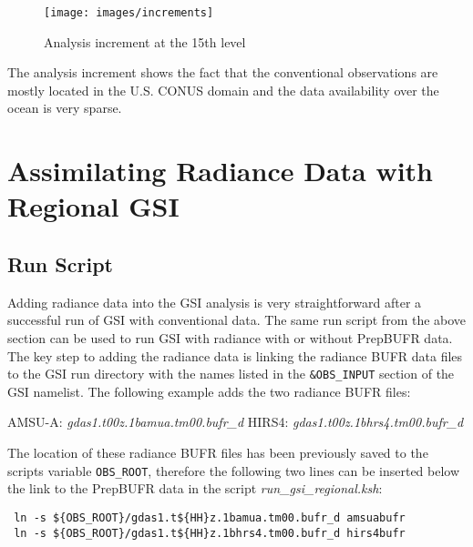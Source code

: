 \begin{figure}[h!]
  \centering
  \texttt{[image: images/increments]}
  \caption{Analysis increment at the 15th level}
  \label{fig:increments}
\end{figure}

The analysis increment shows the fact that the conventional observations are mostly located in the U.S. CONUS domain and the data availability over the ocean is very sparse. 

\section{Assimilating Radiance Data with Regional GSI}

\subsection{Run Script}
\label{sec5.2.1}

Adding radiance data into the GSI analysis is very straightforward after a successful run of GSI with conventional data.  The same run script from the above section can be used to run GSI with radiance with or without PrepBUFR data.  The key step to adding the radiance data is linking the radiance BUFR data files to the GSI run directory with the names listed in the \verb|&OBS_INPUT| section of the GSI namelist. The following example adds the two radiance BUFR files:

AMSU-A:   \textit{gdas1.t00z.1bamua.tm00.bufr\_d}\newline
HIRS4:    \textit{gdas1.t00z.1bhrs4.tm00.bufr\_d}

The location of these radiance BUFR files has been previously saved to the scripts variable \verb|OBS_ROOT|, therefore the following two lines can be inserted below the link to the PrepBUFR data in the script \textit{run\_gsi\_regional.ksh}:

\begin{scriptsize}
\begin{verbatim}
 ln -s ${OBS_ROOT}/gdas1.t${HH}z.1bamua.tm00.bufr_d amsuabufr
 ln -s ${OBS_ROOT}/gdas1.t${HH}z.1bhrs4.tm00.bufr_d hirs4bufr
\end{verbatim}
\end{scriptsize}

